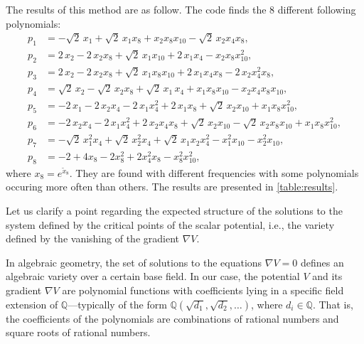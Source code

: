 \documentclass[11pt]{article}
\begin{document}
	The results of this method are as follow. The code finds the 8 different following polynomials: 
	\begin{subequations} \label{eq:pols}
    \begin{align}
      p_{1} &= -\sqrt{2}\,x_{1} + \sqrt{2}\,x_{1}x_8 + x_{2}x_8x_{10} - \sqrt{2}\,x_{2}x_{4}x_8,\\
      p_{2} &= 2\,x_{2} - 2\,x_{2}x_8 + \sqrt{2}\,x_{1}x_{10} + 2\,x_{1}x_{4} - x_{2}x_8x_{10}^{2},\\
      p_{3} &= 2\,x_{2} - 2\,x_{2}x_8 + \sqrt{2}\,x_{1}x_8x_{10} + 2\,x_{1}x_{4}x_8
      		- 2\,x_{2} x_{4}^{2}x_8,\\
      p_{4} &= \sqrt{2}\,x_{2} - \sqrt{2}\,x_{2}x_8 + \sqrt{2}\,x_{1}\,x_{4} + x_{1}x_8x_{10}
      		- x_{2}x_{4}x_8x_{10},\\
      p_{5} &= -2\,x_{1} - 2\,x_{2}x_{4}- 2\,x_{1}x_{4}^{2} + 2\,x_{1}x_8 + \sqrt{2}\,x_{2}x_{10}
      		+ x_{1}x_8x_{10}^{2},\\
      p_{6} &= -2\,x_{2}x_{4} - 2\,x_{1}x_{4}^{2} + 2\,x_{2}x_{4}x_8 + \sqrt{2}\,x_{2}x_{10} 
      		- \sqrt{2}\,x_{2}x_8x_{10} +  x_{1}x_8x_{10}^{2},\\
      p_{7} &= -\sqrt{2}\,x_{1}^{2}x_{4} + \sqrt{2}\,x_{2}^{2}x_{4} + \sqrt{2}\,x_{1}x_{2}x_{4}^{2} - x_{1}^{2}x_{10}
      		- x_{2}^{2}x_{10}, \\
      p_{8} &= -2 + 4 x_{8} - 2 x_8^2 + 2 x_{4}^2 x_8 - x_8^2 x_{10}^2,
    \end{align}
  \end{subequations}
  where $x_{8} = e^{\tilde{x}_{8}}$. They are found with different frequencies with some polynomials occuring more often than others. The results are presented in \eqref{table:results}.
  
  	Let us clarify a point regarding the expected structure of the solutions to the system defined by the critical points of the scalar potential, i.e., the variety defined by the vanishing of the gradient $\nabla V$.
  
  In algebraic geometry, the set of solutions to the equations $\nabla V = 0$ defines an algebraic variety over a certain base field. In our case, the potential $V$ and its gradient $\nabla V$ are polynomial  functions with coefficients lying in a specific field extension of $\mathbb{Q}$—typically of the form $\mathbb{Q}(\sqrt{d_1}, \sqrt{d_2}, \dots)$, where $d_i \in \mathbb{Q}$. That is, the coefficients of the polynomials are combinations of rational numbers and square roots of rational numbers.
  
\end{document}
